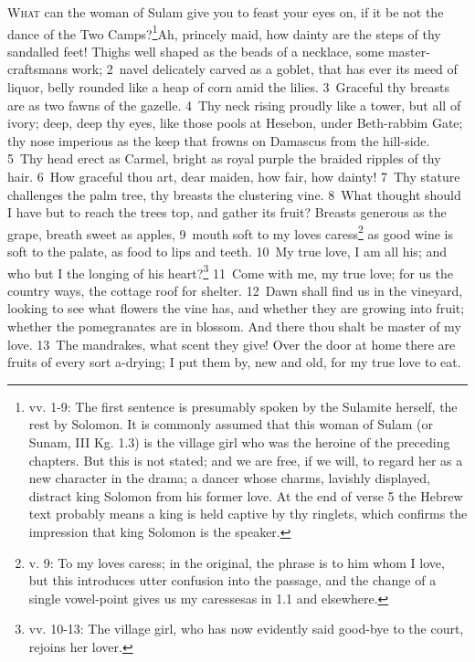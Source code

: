 \documentclass[10pt]{book} %
\begin{document}
\lettrine[lines=2]{W}{hat} can the woman of Sulam give you to feast your eyes on, if it be not the dance of the Two Camps?\footnote[1]{vv. 1-9: The first sentence is presumably spoken by the Sulamite herself, the rest by Solomon. It is commonly assumed that this woman of Sulam (or Sunam, III Kg. 1.3) is the village girl who was the heroine of the preceding chapters. But this is not stated; and we are free, if we will, to regard her as a new character in the drama; a dancer whose charms, lavishly displayed, distract king Solomon from his former love. At the end of verse 5 the Hebrew text probably means \textasciigrave a king is held captive by thy ringlets\textquotesingle , which confirms the impression that king Solomon is the speaker.}Ah, princely maid, how dainty are the steps of thy sandalled feet! Thighs well shaped as the beads of a necklace, some master-craftsman\textquotesingle s work; \textcolor{benred8}{2}~navel delicately carved as a goblet, that has ever its meed of liquor, belly rounded like a heap of corn amid the lilies. \textcolor{benred8}{3}~Graceful thy breasts are as two fawns of the gazelle. \textcolor{benred8}{4}~Thy neck rising proudly like a tower, but all of ivory; deep, deep thy eyes, like those pools at Hesebon, under Beth-rabbim Gate; thy nose imperious as the keep that frowns on Damascus from the hill-side. \textcolor{benred8}{5}~Thy head erect as Carmel, bright as royal purple the braided ripples of thy hair. \textcolor{benred8}{6}~How graceful thou art, dear maiden, how fair, how dainty! \textcolor{benred8}{7}~Thy stature challenges the palm tree, thy breasts the clustering vine. \textcolor{benred8}{8}~What thought should I have but to reach the tree\textquotesingle s top, and gather its fruit? Breasts generous as the grape, breath sweet as apples, \textcolor{benred8}{9}~mouth soft to my love\textquotesingle s caress\footnote[2]{v. 9: \textasciigrave To my love\textquotesingle s caress\textquotesingle ; in the original, the phrase is \textasciigrave to him whom I love\textquotesingle , but this introduces utter confusion into the passage, and the change of a single vowel-point gives us \textasciigrave my caresses\textquotesingle  as in 1.1 and elsewhere.} as good wine is soft to the palate, as food to lips and teeth.
\textcolor{benred8}{10}~My true love, I am all his; and who but I the longing of his heart?\footnote[3]{vv. 10-13: The village girl, who has now evidently said good-bye to the court, rejoins her lover.} \textcolor{benred8}{11}~Come with me, my true love; for us the country ways, the cottage roof for shelter. \textcolor{benred8}{12}~Dawn shall find us in the vineyard, looking to see what flowers the vine has, and whether they are growing into fruit; whether the pomegranates are in blossom. And there thou shalt be master of my love. \textcolor{benred8}{13}~The mandrakes, what scent they give! Over the door at home there are fruits of every sort a-drying; I put them by, new and old, for my true love to eat.
\end{document}
